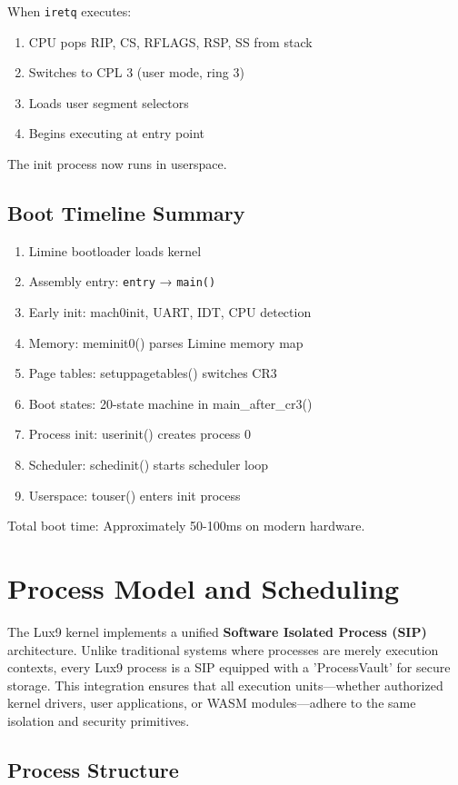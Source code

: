 \documentclass[11pt,letterpaper]{article}
\begin{document}
When \texttt{iretq} executes:
\begin{enumerate}
\item CPU pops RIP, CS, RFLAGS, RSP, SS from stack
\item Switches to CPL 3 (user mode, ring 3)
\item Loads user segment selectors
\item Begins executing at entry point
\end{enumerate}

The init process now runs in userspace.

\subsection{Boot Timeline Summary}

\begin{enumerate}
\item Limine bootloader loads kernel
\item Assembly entry: \texttt{entry} → \texttt{main()}
\item Early init: mach0init, UART, IDT, CPU detection
\item Memory: meminit0() parses Limine memory map
\item Page tables: setuppagetables() switches CR3
\item Boot states: 20-state machine in main\_after\_cr3()
\item Process init: userinit() creates process 0
\item Scheduler: schedinit() starts scheduler loop
\item Userspace: touser() enters init process
\end{enumerate}

Total boot time: Approximately 50-100ms on modern hardware.


\section{Process Model and Scheduling}

The Lux9 kernel implements a unified \textbf{Software Isolated Process (SIP)} architecture. Unlike traditional systems where processes are merely execution contexts, every Lux9 process is a SIP equipped with a 'ProcessVault' for secure storage. This integration ensures that all execution units—whether authorized kernel drivers, user applications, or WASM modules—adhere to the same isolation and security primitives.

\subsection{Process Structure}
\end{document}
